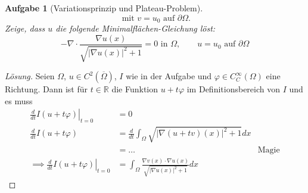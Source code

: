 \documentclass{scrartcl}
\newcommand{\abs}[1]{\left\lvert #1 \right\rvert}
\newcommand{\Rand}[1]{\partial #1}
\newcommand{\reals}{\mathbb{R}}
\newcommand{\closure}[1]{\overline{#1}}
\newtheorem {problem} {Aufgabe}
\theoremstyle{remark}
\begin{document}
\begin{problem}[Variationsprinzip und Plateau-Problem]
\begin{equation}
    \text{ mit } v = u_0 \text{ auf } \Rand {\Omega}.
  \end{equation}
  Zeige, dass $u$ die folgende Minimalflächen-Gleichung löst:
  \begin{equation}
    - \nabla
    \cdot
    \frac
      {\nabla u(x)}
      {\sqrt{\abs{\nabla u(x)}^2 + 1}}
    = 0 \text{ in } \Omega, \qquad u = u_0 \text{ auf } \Rand{\Omega}
  \end{equation}

  \end{problem}

  \begin{proof}[Lösung]
    Seien $\Omega$, $u \in C^2(\closure{\Omega})$, $I$ wie in der Aufgabe
    und $\varphi \in C_C^{\infty}(\Omega)$ eine Richtung.
    Dann ist für $t \in \reals$ die Funktion $u + t\varphi$ im Definitionsbereich von $I$ und es muss
    \begin{align}
      \left. \frac {d}{dt} I(u + t\varphi) \right|_{t = 0} & = 0 \\
      \frac {d}{dt} I(u + t\varphi)  &=
      \frac {d}{dt} \int_{\Omega} \sqrt{
        \abs{
          \nabla(u+tv) (x)
        }^2 + 1
      } d x\\
      & = \dots & \text{Magie}\\
      \implies \left. \frac {d}{dt} I(u + t\varphi) \right|_{t = 0} & =
      \int_{\Omega} \frac
        {\nabla v (x) \cdot \nabla u(x)}
        {\sqrt{
          \abs{
            \nabla u(x)
            }^2 + 1
          }
        }
      d x
    \end{align}

  \end{proof}
\end{document}
